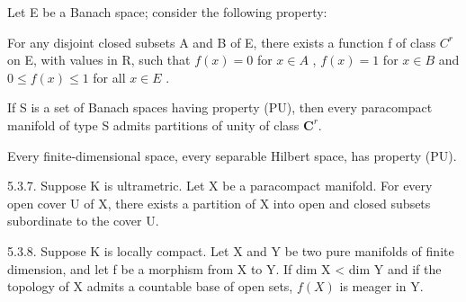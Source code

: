 Let E be a Banach space; consider the following property:

For any disjoint closed subsets A and B of E, there exists a function f of class \(C^{r}\) on E, with values in R, such that \(f(x) = 0\) for \(x \in A\) , \(f(x) = 1\) for \(x \in B\) and \(0 \leqslant f(x) \leqslant 1\) for all \(x \in E\) .

If S is a set of Banach spaces having property (PU), then every paracompact manifold of type S admits partitions of unity of class \(\mathbf{C}^{r}\).

Every finite-dimensional space, every separable Hilbert space, has property (PU).

5.3.7. Suppose K is ultrametric. Let X be a paracompact manifold. For every open cover U of X, there exists a partition of X into open and closed subsets subordinate to the cover U.

5.3.8. Suppose K is locally compact. Let X and Y be two pure manifolds of finite dimension, and let f be a morphism from X to Y. If dim X \textless{} dim Y and if the topology of X admits a countable base of open sets, \(f(X)\) is meager in Y.
\relax{}
